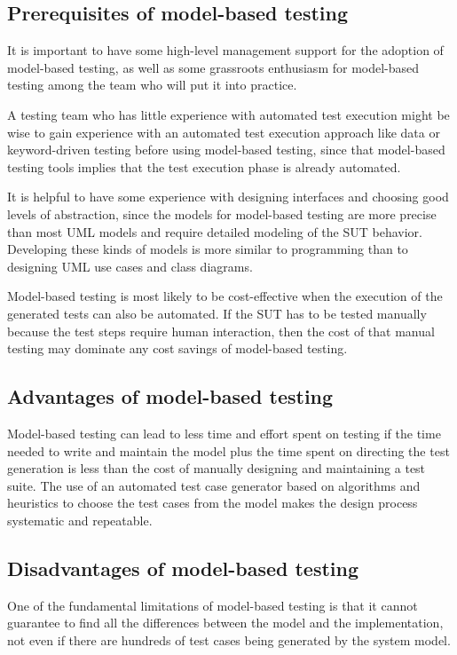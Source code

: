 \subsection{Prerequisites of model-based testing}

It is important to have some high-level management support for the adoption of model-based testing, as well as some grassroots enthusiasm for model-based testing among the team who will put it into practice.

A testing team who has little experience with automated test execution might be wise to gain experience with an automated test execution approach like data or keyword-driven testing before using model-based testing, since that model-based testing tools implies that the test execution phase is already automated.

It is helpful to have some experience with designing interfaces and choosing good levels of abstraction, since the models for model-based testing are more precise than most UML models and require detailed modeling of the SUT behavior. Developing these kinds of models is more similar to programming than to designing UML use cases and class diagrams.

Model-based testing is most likely to be cost-effective when the execution of the generated tests can also be automated. If the SUT has to be tested manually because the test steps require human interaction, then the cost of that manual testing may dominate any cost savings of model-based testing.

\subsection{Advantages of model-based testing}
Model-based testing can lead to less time and effort spent
on testing if the time needed to write and maintain the model 
plus the time spent on directing the test generation is less 
than the cost of manually designing and maintaining a test suite. The use of an automated test case generator based on algorithms and heuristics to choose the test cases from the model makes the design process systematic and repeatable.

\subsection{Disadvantages of model-based testing}
One of the fundamental limitations of model-based testing is that it cannot guarantee to find all the differences between the model and the implementation, not even if there are hundreds of test cases being generated by the system model.

